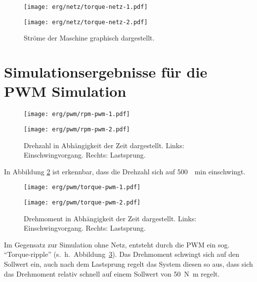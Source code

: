 \begin{figure}[h!]
	\begin{minipage}[t]{0.5\textwidth}
		\texttt{[image: erg/netz/torque-netz-1.pdf]}
	\end{minipage}
	\begin{minipage}[t]{0.5\textwidth} 
		\texttt{[image: erg/netz/torque-netz-2.pdf]}
	\end{minipage}
	\caption{Ströme der Maschine graphisch dargestellt.}
	\label{fig:mi-netz}
\end{figure}

\newpage

\section{Simulationsergebnisse für die PWM Simulation}\label{sec:sim-pwm}

\begin{figure}[h!]
	\begin{minipage}[t]{0.5\textwidth}
		\texttt{[image: erg/pwm/rpm-pwm-1.pdf]}
	\end{minipage}
	\begin{minipage}[t]{0.5\textwidth} 
		\texttt{[image: erg/pwm/rpm-pwm-2.pdf]}
	\end{minipage}
	\caption{Drehzahl in Abhängigkeit der Zeit dargestellt. Links: Einschwingvorgang. Rechts: Lastsprung.}
	\label{fig:n-pwm}
\end{figure}

In Abbildung \ref{fig:n-pwm} ist erkennbar, dass die Drehzahl sich auf \SI{500}{\per\minute} einschwingt.

\begin{figure}[h!]
	\begin{minipage}[t]{0.5\textwidth}
		\texttt{[image: erg/pwm/torque-pwm-1.pdf]}
	\end{minipage}
	\begin{minipage}[t]{0.5\textwidth} 
		\texttt{[image: erg/pwm/torque-pwm-2.pdf]}
	\end{minipage}
	\caption{Drehmoment in Abhängigkeit der Zeit dargestellt. Links: Einschwingvorgang. Rechts: Lastsprung.}
	\label{fig:mi-pwm}
\end{figure}

Im Gegensatz zur Simulation ohne Netz, entsteht durch die PWM ein sog. \enquote{Torque-ripple} (s.~h.~Abbildung~\ref{fig:mi-pwm}).
Das Drehmoment schwingt sich auf den Sollwert ein, auch nach dem Lastsprung regelt das System diesen so aus, dass sich das Drehmoment relativ schnell auf einem Sollwert von \SI{50}{\newton\meter} regelt.

